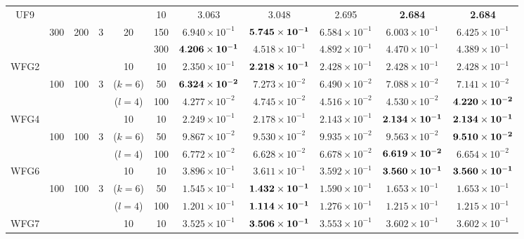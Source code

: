 \documentclass[../main/main]{subfiles}
\begin{document}
\begin{table}[htbp]
\begin{tabular}{c|ccccc|c|c|c|c|c}
\hline
\multirow{3}{*}{UF9} &        &      && & 10& 3.063 & 3.048 & 2.695 & \bf{2.684} & \bf{2.684}\\
  				   & 300 & 200 & 3 &20 &150 & $6.940 \times 10^{-1}$ & $\bf{5.745 \times 10^{-1}}$ & $6.584 \times 10^{-1}$ & $6.003 \times 10^{-1}$ & $6.425 \times 10^{-1}$\\
				   &        &      &&  &300   &$\bf{4.206 \times 10^{-1}}$ &  $4.518 \times 10^{-1}$ & $4.892 \times 10^{-1}$ & $4.470 \times 10^{-1}$ & $4.389 \times 10^{-1}$\\
\hline
\multirow{3}{*}{WFG2} &        &   &&  10  & 10 & $2.350 \times 10^{-1}$ & $\bf{2.218 \times 10^{-1}}$ & $2.428 \times 10^{-1}$ & $2.428 \times 10^{-1}$ & $2.428 \times 10^{-1}$\\
  				   & 100 & 100 & 3 & ($k=6$) &50 & $\bf{6.324 \times 10^{-2}}$ & $7.273 \times 10^{-2}$ & $6.490 \times 10^{-2}$ & $7.088 \times 10^{-2}$ & $7.141 \times 10^{-2}$\\
				   &        &      && ($l=4$) &100 & $4.277 \times 10^{-2}$ & $4.745 \times 10^{-2}$ & $4.516 \times 10^{-2}$ & $4.530 \times 10^{-2}$ & $\bf{4.220 \times 10 ^{-2}}$\\
\hline
\multirow{3}{*}{WFG4} &        &   &&  10  & 10 & $2.249 \times 10^{-1}$ & $2.178 \times 10^{-1}$ & $2.143 \times 10^{-1}$ & $\bf{2.134 \times 10^{-1}}$ & $\bf{2.134 \times 10 ^{-1}}$\\
  				   & 100 & 100 & 3 & ($k=6$) & 50 & $9.867 \times 10^{-2}$ & $9.530 \times 10^{-2}$ & $9.935 \times 10^{-2}$ & $9.563 \times 10^{-2}$ & $\bf{9.510 \times 10 ^{-2}}$\\
				   &        &     && ($l=4$)  &100 & $6.772 \times 10^{-2}$ & $6.628 \times 10^{-2}$ & $6.678 \times 10^{-2}$ & $\bf{6.619 \times 10^{-2}}$ & $6.654 \times 10 ^{-2}$\\
\hline
\multirow{3}{*}{WFG6} &        &  &&  10   & 10 & $3.896 \times 10^{-1}$ & $3.611 \times 10^{-1}$ & $3.592 \times 10^{-1}$ & $\bf{3.560 \times 10^{-1}}$ & $\bf{3.560 \times 10 ^{-1}}$\\
  				   & 100 & 100 & 3 & ($k=6$) & 50  & $1.545 \times 10^{-1}$ & $\bf{1.432 \times 10^{-1}}$ & $1.590 \times 10^{-1}$ & $1.653 \times 10^{-1}$ & $1.653 \times 10^{-1}$\\
				   &        &      && ($l=4$) &100  & $1.201 \times 10^{-1}$ & $\bf{1.114 \times 10^{-1}}$ & $1.276 \times 10^{-1}$ & $1.215 \times 10^{-1}$ & $1.215 \times 10^{-1}$\\
\hline
\multirow{3}{*}{WFG7} &        &   &&  10  & 10 & $3.525 \times 10^{-1}$ & $\bf{3.506 \times 10^{-1}}$ & $3.553 \times 10^{-1}$ & $3.602 \times 10^{-1}$ & $3.602 \times 10^{-1}$\\

\end{tabular}
\end{table}
\end{document}

